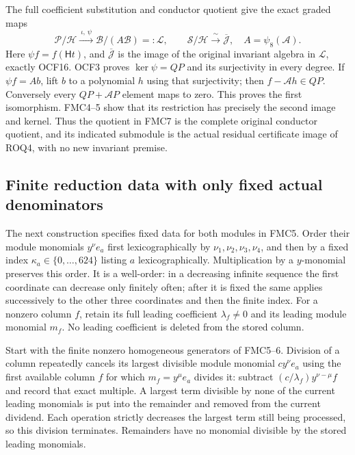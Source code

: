 \documentclass[11pt,a4paper]{article}
\begin{document}
The full coefficient substitution and conductor quotient give the exact
graded maps
\[
 \mathscr P/\mathscr H\xrightarrow{\ \iota,\,\psi\ }
          \mathcal B/(A\mathcal B)=:\mathcal L,
 \qquad
 \mathscr S/\mathscr H\xrightarrow{\ \sim\ }\overline{\mathscr J},
 \quad A=\psi_8(\mathcal A).
 \tag{FMC7}
\]
Here $\psi f=f(\mathsf Ht)$, and $\overline{\mathscr J}$ is the
image of the original invariant algebra in $\mathcal L$, exactly
OCF16. OCF3 proves $\ker\psi=QP$ and its surjectivity in every
degree. If $\psi f=A b$, lift $b$ to a polynomial $h$ using that
surjectivity; then $f-\mathcal A h\in QP$. Conversely every
$QP+\mathcal AP$ element maps to zero. This proves the first
isomorphism. FMC4--5 show that its restriction has precisely the
second image and kernel. Thus the quotient in FMC7 is the complete
original conductor quotient, and its indicated submodule is the
actual residual certificate image of ROQ4, with no new invariant
premise.

\subsection{Finite reduction data with only fixed actual denominators}

The next construction specifies fixed data for both modules in FMC5.
Order their module monomials $y^\nu e_a$ first lexicographically by
$\nu_1,\nu_2,\nu_3,\nu_4$, and then by a fixed index
$\kappa_a\in\{0,\ldots,624\}$ listing $a$ lexicographically.
Multiplication by a $y$-monomial preserves this order. It is a
well-order: in a decreasing infinite sequence the first coordinate
can decrease only finitely often; after it is fixed the same applies
successively to the other three coordinates and then the finite index.
For a nonzero column $f$, retain its full leading coefficient
$\lambda_f\ne0$ and its leading module monomial $m_f$.
No leading coefficient is deleted from the stored column.

Start with the finite nonzero homogeneous generators of FMC5--6.
Division of a column repeatedly cancels its largest divisible module
monomial $c y^\nu e_a$ using the first available column $f$ for which
$m_f=y^\mu e_a$ divides it: subtract
$(c/\lambda_f)y^{\nu-\mu}f$ and record that exact multiple.
A largest term divisible by none of the current leading monomials is
put into the remainder and removed from the current dividend.
Each operation strictly decreases the largest term still being
processed, so this division terminates. Remainders have no monomial
divisible by the stored leading monomials.
\end{document}
